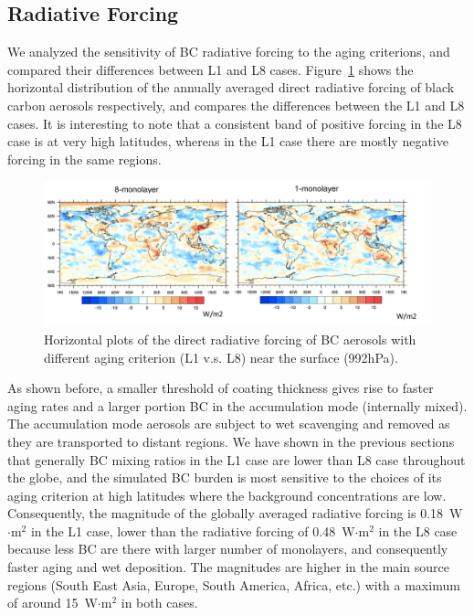 \documentclass[12pt, fullpage]{uiucthesis2009}
\begin{document}
	\subsection{Radiative Forcing }
	We analyzed the sensitivity of BC radiative forcing to the aging criterions, and compared their differences between L1 and L8 cases. Figure~\ref{fig_P23} shows the horizontal distribution of the annually averaged direct radiative forcing of black carbon aerosols respectively, and compares the differences between the L1 and L8 cases. It is interesting to note that a consistent band of positive forcing in the L8 case is at very high latitudes, whereas in the L1 case there are mostly negative forcing in the same regions.
	\begin{figure}[h] 
		\begin{center}
			\includegraphics[width = 1\textwidth]{Figure23}
			\caption[Horizontal plots of the direct radiative forcing of BC aerosols with different aging criterion (L1 v.s. L8) near the surface (992hPa)]{\label{fig_P23} Horizontal plots of the direct radiative forcing of BC aerosols with different aging criterion (L1 v.s. L8) near the surface (992hPa).}
		\end{center}
	\end{figure}
	
	
	As shown before, a smaller threshold of coating thickness gives rise to faster aging rates and a larger portion BC in the accumulation mode (internally mixed). The accumulation mode aerosols are subject to wet scavenging and removed as they are transported to distant regions. We have shown in the previous sections that generally BC mixing ratios in the L1 case are lower than L8 case throughout the globe, and the simulated BC burden is most sensitive to the choices of its aging criterion at high latitudes where the background concentrations are low. Consequently, the magnitude of the globally averaged radiative forcing is 0.18~W$\cdot{\text{m}^2}$ in the L1 case, lower than the radiative forcing of 0.48~W$\cdot{\text{m}^2}$ in the L8 case because less BC are there with larger number of monolayers, and consequently faster aging and wet deposition. The magnitudes are higher in the main source regions (South East Asia, Europe, South America, Africa, etc.) with a maximum of around 15~W$\cdot{\text{m}^2}$ in both cases. 
	
\end{document}

